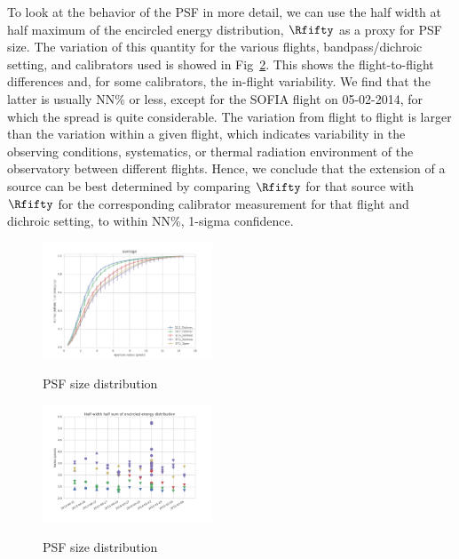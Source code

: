 To look at the behavior of the PSF in more detail, we can use the half width at half maximum of the encircled energy distribution, $\Rfifty$ as a proxy for PSF size. The variation of this quantity for the various flights, bandpass/dichroic setting, and calibrators used is showed in Fig~\ref{fig:Rfifty_dist}. This shows the flight-to-flight differences and, for some calibrators, the in-flight variability. We find that the latter is usually NN\% or less, except for the SOFIA flight on 05-02-2014, for which the spread is quite considerable. The variation from flight to flight is larger than the variation within a given flight, which indicates variability in the observing conditions, systematics, or thermal radiation environment of the observatory between different flights. Hence, we conclude that the extension of a source can be best determined by comparing $\Rfifty$ for that source with $\Rfifty$ for the corresponding calibrator measurement for that flight and dichroic setting, to within NN\%, 1-sigma confidence.
\begin{figure}
\begin{center}

\includegraphics[width=0.45\textwidth]{Figures/average.png}
\label{fig:average_EE}
\caption{PSF size distribution}
\end{center}
\end{figure}

\begin{figure}
\begin{center}

\includegraphics[width=0.45\textwidth]{Figures/fwhs.png}
\label{fig:Rfifty_dist}

\caption{PSF size distribution}
\end{center}
\end{figure}

